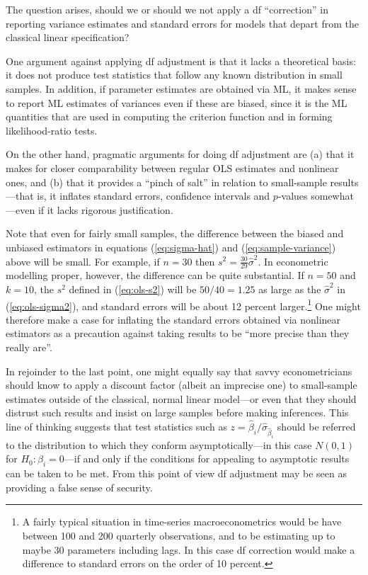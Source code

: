 The question arises, should we or should we not apply a df
``correction'' in reporting variance estimates and standard errors
for models that depart from the classical linear specification?

One argument against applying df adjustment is that it lacks a
theoretical basis: it does not produce test statistics that follow any
known distribution in small samples.  In addition, if parameter
estimates are obtained via ML, it makes sense to report ML estimates
of variances even if these are biased, since it is the ML quantities
that are used in computing the criterion function and in forming
likelihood-ratio tests.

On the other hand, pragmatic arguments for doing df adjustment are (a)
that it makes for closer comparability between regular OLS estimates
and nonlinear ones, and (b) that it provides a ``pinch of salt'' in
relation to small-sample results---that is, it inflates standard
errors, confidence intervals and $p$-values somewhat---even if it
lacks rigorous justification.

Note that even for fairly small samples, the difference between the
biased and unbiased estimators in equations (\ref{eq:sigma-hat}) and
(\ref{eq:sample-variance}) above will be small.  For example, if
$n=30$ then $s^2 = \frac{30}{29} \hat\sigma^2$.  In econometric
modelling proper, however, the difference can be quite substantial.
If $n=50$ and $k=10$, the $s^2$ defined in (\ref{eq:ols-s2}) will be
$50/40 = 1.25$ as large as the $\hat\sigma^2$ in
(\ref{eq:ols-sigma2}), and standard errors will be about 12 percent
larger.\footnote{A fairly typical situation in time-series
  macroeconometrics would be have between 100 and 200 quarterly
  observations, and to be estimating up to maybe 30 parameters
  including lags.  In this case df correction would make a difference
  to standard errors on the order of 10 percent.}  One might therefore
make a case for inflating the standard errors obtained via
nonlinear estimators as a precaution against taking results to be
``more precise than they really are''.

In rejoinder to the last point, one might equally say that savvy
econometricians should know to apply a discount factor (albeit an
imprecise one) to small-sample estimates outside of the classical,
normal linear model---or even that they should distrust such results
and insist on large samples before making inferences. This line of
thinking suggests that test statistics such as $z =
\hat{\beta}_i/\hat\sigma_{\hat{\beta}_i}$ should be referred to the
distribution to which they conform asymptotically---in this case
$N(0,1)$ for $H_0: \beta_i = 0$---if and only if the conditions for
appealing to asymptotic results can be taken to be met.  From this
point of view df adjustment may be seen as providing a false sense of
security.  


